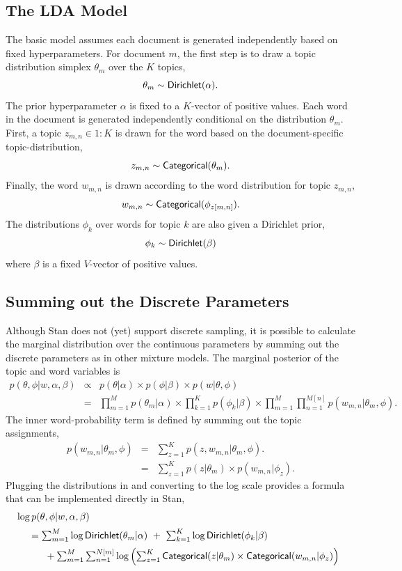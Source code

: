 \subsection{The LDA Model}

The basic model assumes each document is generated independently based
on fixed hyperparameters. For document $m$, the first step is to draw a topic
distribution simplex $\theta_m$ over the $K$ topics,
%
\[
\theta_m \sim \mbox{\sf Dirichlet}(\alpha).
\]
%
The prior hyperparameter $\alpha$ is fixed to a $K$-vector of positive
values.  Each word in the document is generated independently
conditional on the distribution $\theta_m$.  First, a topic
$z_{m,n} \in 1{:}K$ is drawn for the word based on the
document-specific topic-distribution,
\[
z_{m,n} \sim \mbox{\sf Categorical}(\theta_m).
\]
%
Finally, the word $w_{m,n}$ is drawn according to the word distribution
for topic $z_{m,n}$,
\[
w_{m,n} \sim \mbox{\sf Categorical}(\phi_{z[m,n]}).
\]
The distributions $\phi_k$ over words for topic $k$ are also given a
Dirichlet prior,
\[
\phi_k \sim \mbox{\sf Dirichlet}(\beta)
\]
%
where $\beta$ is a fixed $V$-vector of positive values.

\subsection{Summing out the Discrete Parameters}

Although Stan does not (yet) support discrete sampling, it is possible
to calculate the marginal distribution over the continuous parameters
by summing out the discrete parameters as in other mixture models.
The marginal posterior of the topic and word variables is
%
\begin{eqnarray*}
p(\theta,\phi|w,\alpha,\beta)
& \propto &
p(\theta|\alpha) \times p(\phi|\beta) \times p(w|\theta,\phi)
\\[4pt]
& = &
\prod_{m=1}^M p(\theta_m|\alpha)
\times
\prod_{k=1}^K p(\phi_k|\beta)
\times
\prod_{m=1}^M \prod_{n=1}^{M[n]} p(w_{m,n}|\theta_m,\phi).
\end{eqnarray*}
%
The inner word-probability term is defined by summing out the
topic assignments,
\begin{eqnarray*}
p(w_{m,n}|\theta_m,\phi)
& = &
\sum_{z=1}^K p(z,w_{m,n}|\theta_m,\phi).
\\[4pt]
& = &
\sum_{z=1}^K p(z|\theta_m) \times p(w_{m,n}|\phi_z).
\end{eqnarray*}
%
Plugging the distributions in and converting to the log scale provides a
formula that can be implemented directly in Stan,
\[
\begin{array}{l}
\log p(\theta,\phi|w,\alpha,\beta)
\\[6pt]
{ } \ \
\begin{array}{l}
{ } = \sum_{m=1}^M \log \mbox{\sf Dirichlet}(\theta_m|\alpha)
\ + \
\sum_{k=1}^K \log \mbox{\sf Dirichlet}(\phi_k|\beta)
\\[6pt]
{ } \ \ \ \ \
+ \sum_{m=1}^M \sum_{n=1}^{N[m]} \log \left(
\sum_{z=1}^K
  \mbox{\sf Categorical}(z|\theta_m)
   \times \mbox{\sf Categorical}(w_{m,n}|\phi_z)
 \right)
\end{array}
\end{array}
\]

